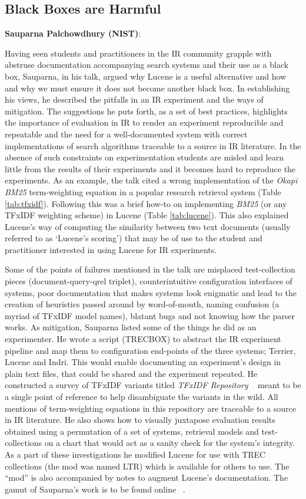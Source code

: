 \subsection*{Black Boxes are Harmful}
{\bf Sauparna Palchowdhury (NIST)}:

Having seen students and practitioners in the IR community grapple
with abstruse documentation accompanying search systems and their use
as a black box, Sauparna, in his talk, argued why Lucene is a useful
alternative and how and why we must ensure it does not become another
black box. In establishing his views, he described the pitfalls in an
IR experiment and the ways of mitigation. The suggestions he puts
forth, as a set of best practices, highlights the importance of
evaluation in IR to render an experiment reproducible and repeatable
and the need for a well-documented system with correct implementations
of search algorithms traceable to a source in IR literature. In the
absence of such constraints on experimentation students are misled and
learn little from the results of their experiments and it becomes hard
to reproduce the experiments. As an example, the talk cited a wrong
implementation of the \emph{Okapi BM25} term-weighting equation in a
popular research retrieval system (Table \ref{tab:tfxidf}). Following
this was a brief how-to on implementing \emph{BM25} (or any TFxIDF
weighting scheme) in Lucene (Table \ref{tab:lucene}). This also
explained Lucene's way of computing the similarity between two text
documents (usually referred to as `Lucene's scoring') that may be of
use to the student and practitioner interested in using Lucene for IR
experiments.

Some of the points of failures mentioned in the talk are misplaced
test-collection pieces (document-query-qrel triplet), counterintuitive
configuration interfaces of systems, poor documentation that makes
systems look enigmatic and lead to the creation of heuristics passed
around by word-of-mouth, naming confusion (a myriad of TFxIDF model
names), blatant bugs and not knowing how the parser works. As
mitigation, Sauparna listed some of the things he did as an
experimenter. He wrote a script (TRECBOX) to abstract the IR
experiment pipeline and map them to configuration end-points of the
three systems; Terrier, Lucene and Indri. This would enable
documenting an experiment's design in plain text files, that could be
shared and the experiment repeated. He constructed a survey of TFxIDF
variants titled \emph{TFxIDF Repository} ~\cite{rup:TFXIDFRepository}
meant to be a single point of reference to help disambiguate the
variants in the wild. All mentions of term-weighting equations in this
repository are traceable to a source in IR literature. He also shows
how to visually juxtapose evaluation results obtained using a
permutation of a set of systems, retrieval models and test-collections
on a chart that would act as a sanity check for the system's
integrity. As a part of these investigations he modified Lucene for
use with TREC collections (the mod was named LTR) which is available
for others to use. The ``mod'' is also accompanied by notes to augment
Lucene's documentation. The gamut of Sauparna's work is to be found
online ~\cite{rup:IR}.


